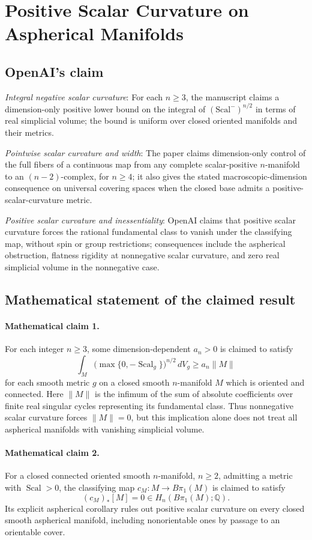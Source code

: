 \documentclass[11pt]{article}
\begin{document}
\section*{Positive Scalar Curvature on Aspherical Manifolds}

\subsection{OpenAI's claim}
\textit{Integral negative scalar curvature}: For each $n\ge3$, the manuscript claims a dimension-only positive lower bound on the integral of $(\mathrm{Scal}^-)^{n/2}$ in terms of real simplicial volume; the bound is uniform over closed oriented manifolds and their metrics.

\textit{Pointwise scalar curvature and width}: The paper claims dimension-only control of the full fibers of a continuous map from any complete scalar-positive $n$-manifold to an $(n-2)$-complex, for $n\ge4$; it also gives the stated macroscopic-dimension consequence on universal covering spaces when the closed base admits a positive-scalar-curvature metric.

\textit{Positive scalar curvature and inessentiality}: OpenAI claims that positive scalar curvature forces the rational fundamental class to vanish under the classifying map, without spin or group restrictions; consequences include the aspherical obstruction, flatness rigidity at nonnegative scalar curvature, and zero real simplicial volume in the nonnegative case.

\subsection{Mathematical statement of the claimed result}
\paragraph{Mathematical claim 1.} For each integer $n\ge3$, some dimension-dependent $a_n>0$ is claimed to satisfy \[\int_M\bigl(\max\{0,-\operatorname{Scal}_g\}\bigr)^{n/2}\,dV_g\ge a_n\|M\|\] for each smooth metric $g$ on a closed smooth $n$-manifold $M$ which is oriented and connected. Here $\|M\|$ is the infimum of the sum of absolute coefficients over finite real singular cycles representing its fundamental class. Thus nonnegative scalar curvature forces $\|M\|=0$, but this implication alone does not treat all aspherical manifolds with vanishing simplicial volume.

\paragraph{Mathematical claim 2.} For a closed connected oriented smooth $n$-manifold, $n\ge2$, admitting a metric with $\operatorname{Scal}>0$, the classifying map $c_M:M\to B\pi_1(M)$ is claimed to satisfy \[(c_M)_*[M]=0\in H_n(B\pi_1(M);\mathbb Q).\] Its explicit aspherical corollary rules out positive scalar curvature on every closed smooth aspherical manifold, including nonorientable ones by passage to an orientable cover.
\end{document}
